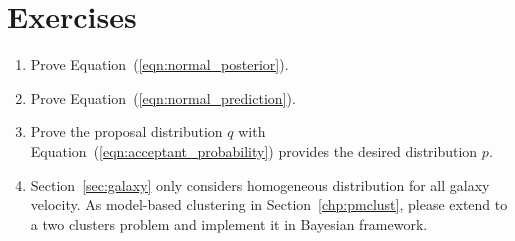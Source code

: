 



\section{Exercises}
\label{sec:mle_exercise}

\begin{enumerate}[label=\thechapter-\arabic*]

\item
Prove Equation~(\ref{eqn:normal_posterior}).

\item
Prove Equation~(\ref{eqn:normal_prediction}).

\item
Prove the proposal distribution $q$ with
Equation~(\ref{eqn:acceptant_probability}) provides the desired
distribution $p$.

\item
Section~\ref{sec:galaxy} only considers homogeneous distribution for all
galaxy velocity. As model-based clustering in Section~\ref{chp:pmclust},
please extend to a two clusters problem and implement it in Bayesian
framework.

\end{enumerate}

